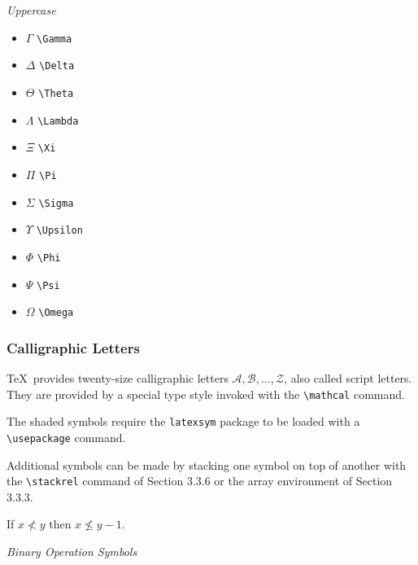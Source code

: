 \documentclass[twocolumn]{book}        %
\begin{document}
\emph{Uppercase}

\begin{itemize}
    \item ${\Gamma}$ \texttt{\textbackslash Gamma}
    \item ${\Delta}$ \texttt{\textbackslash Delta}
    \item ${\Theta}$ \texttt{\textbackslash Theta}
    \item ${\Lambda}$ \texttt{\textbackslash Lambda}
    \item ${\Xi}$ \texttt{\textbackslash Xi}
    \item ${\Pi}$ \texttt{\textbackslash Pi}
    \item ${\Sigma}$ \texttt{\textbackslash Sigma}
    \item ${\Upsilon}$ \texttt{\textbackslash Upsilon}
    \item ${\Phi}$ \texttt{\textbackslash Phi}
    \item ${\Psi}$ \texttt{\textbackslash Psi}
    \item ${\Omega}$ \texttt{\textbackslash Omega}
\end{itemize}

\subsubsection{Calligraphic Letters}

\TeX\ provides twenty-size calligraphic letters 
$\mathcal{A}, \mathcal{B}, \ldots, \mathcal{Z}$, also called script letters.
They are provided by a special type style invoked with the \texttt{\textbackslash mathcal}
command.

The shaded symbols require the \texttt{latexsym} package to be loaded with 
a \texttt{\textbackslash usepackage} command.

Additional symbols can be made by stacking one symbol on top of another with the 
\texttt{\textbackslash stackrel} command of Section 3.3.6 or the array environment 
of Section 3.3.3.

If $x \not< y$ then \( x \not\leq y-1\).

\emph{Binary Operation Symbols}
\end{document}
